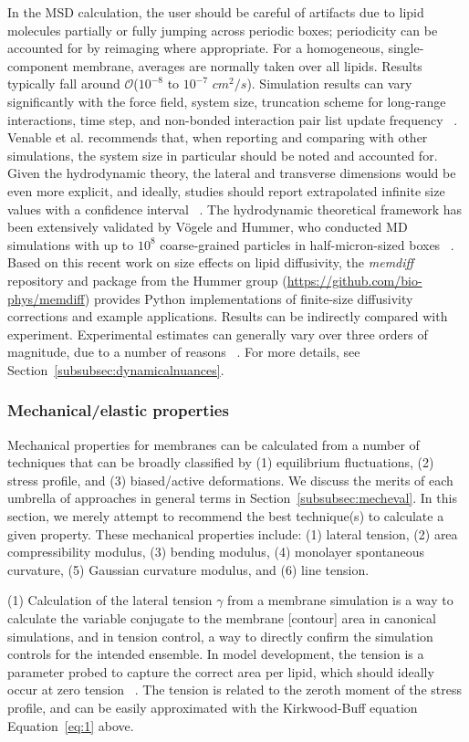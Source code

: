 \documentclass[9pt,bestpractices,pubversion]{livecoms}
\begin{document}
In the MSD calculation, the user should be careful of artifacts due to lipid molecules partially or fully jumping across periodic boxes; periodicity can be accounted for by reimaging where appropriate.
For a homogeneous, single-component membrane, averages are normally taken over all lipids.
Results typically fall around $\mathcal{O}$($10^{-8}$ to $10^{-7}$ $cm^2/s$).
Simulation results can vary significantly with the force field, system size, truncation scheme for long-range interactions, time step, and non-bonded interaction pair list update frequency ~\cite{Poger2016}.
Venable et al. recommends that, when reporting and comparing with other simulations, the system size in particular should be noted and accounted for.
Given the hydrodynamic theory, the lateral and transverse dimensions would be even more explicit, and ideally, studies should report extrapolated infinite size values with a confidence interval ~\cite{Venable2017}.
The hydrodynamic theoretical framework has been extensively validated by V\"ogele and Hummer, who conducted MD simulations with up to $10^8$ coarse-grained particles in half-micron-sized boxes ~\cite{Vogele2018}.
Based on this recent work on size effects on lipid diffusivity, the \textit{memdiff} repository and package from the Hummer group (\url{https://github.com/bio-phys/memdiff}) provides Python implementations of finite-size diffusivity corrections and example applications.
Results can be indirectly compared with experiment.
Experimental estimates can generally vary over three orders of magnitude, due to a number of reasons ~\cite{Poger2016}.
For more details, see Section~\ref{subsubsec:dynamicalnuances}.

\subsubsection{Mechanical/elastic properties}
\label{subsubsec:mechprops}
Mechanical properties for membranes can be calculated from a number of techniques that can be broadly classified by (1) equilibrium fluctuations, (2) stress profile, and (3) biased/active deformations.
We discuss the merits of each umbrella of approaches in general terms in Section~\ref{subsubsec:mecheval}.
In this section, we merely attempt to recommend the best technique(s) to calculate a given property.
These mechanical properties include: (1) lateral tension, (2) area compressibility modulus, (3) bending modulus, (4) monolayer spontaneous curvature, (5) Gaussian curvature modulus, and (6) line tension.

(1) Calculation of the lateral tension $\gamma$ from a membrane simulation is a way to calculate the variable conjugate to the membrane [contour] area in canonical simulations, and in tension control, a way to directly confirm the simulation controls for the intended ensemble.
In model development, the tension is a parameter probed to capture the correct area per lipid, which should ideally occur at zero tension ~\cite{Zgorski2016}.
The tension is related to the zeroth moment of the stress profile, and can be easily approximated with the Kirkwood-Buff equation Equation~\ref{eq:1} above.
\end{document}
